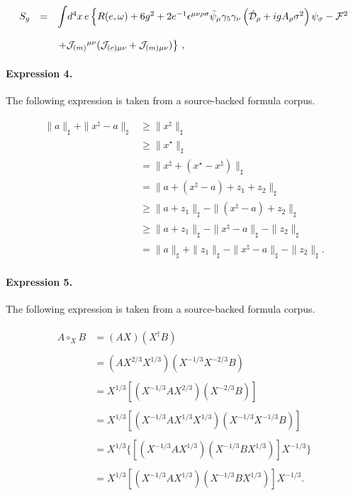 \documentclass[11pt]{article}
\begin{document}
\begin{align*}\begin{array}{rcl}S_{g} & = & {\displaystyle\int} d^{4}x\, e \left\{ R(e,\omega) +6g^{2}+2 e^{-1}\epsilon^{\mu\nu\rho\sigma}\bar{\psi}_{\mu}\gamma_{5}\gamma_{\nu}\left(\hat{\cal D}_{\rho}+ig A_{\rho}\sigma^{2}\right)\psi_{\sigma}-{\cal F}^{2} \right.\\& & \\& & \left. +{\cal J}_{(m)}{}^{\mu\nu}({\cal J}_{(e) \mu\nu} +{\cal J}_{(m) \mu\nu}) \right\}\, ,\end{array}\end{align*}

\paragraph{Expression 4.} The following expression is taken from a source-backed formula corpus.

\begin{align*}\|a\|_\sharp+\|x^\natural-a\|_\sharp&\geq\|x^\natural\|_\sharp\\&\geq\|x^\star\|_\sharp\\&=\|x^\natural+(x^\star-x^\natural)\|_\sharp\\&=\|a+(x^\natural-a)+z_1+z_2\|_\sharp\\&\geq\|a+z_1\|_\sharp-\|(x^\natural-a)+z_2\|_\sharp\\&\geq\|a+z_1\|_\sharp-\|x^\natural-a\|_\sharp-\|z_2\|_\sharp\\&=\|a\|_\sharp+\|z_1\|_\sharp-\|x^\natural-a\|_\sharp-\|z_2\|_\sharp.\end{align*}

\paragraph{Expression 5.} The following expression is taken from a source-backed formula corpus.

\begin{align*}\begin{array}{rl}A\circ_{X}B & = (AX)(X^{ \dagger }B) \\ \\& = (AX^{2/3}X^{1/3})(X^{-1/3}X^{-2/3}B) \\ \\& = X^{1/3}[(X^{-1/3}AX^{2/3})(X^{-2/3}B)] \\ \\& = X^{1/3}[(X^{-1/3}AX^{1/3}X^{1/3})(X^{-1/3}X^{-1/3}B)] \\ \\& = X^{1/3}\{[(X^{-1/3}AX^{1/3})(X^{-1/3}BX^{1/3})]X^{-1/3}\} \\\\ & = X^{1/3}[(X^{-1/3}AX^{1/3})(X^{-1/3}BX^{1/3})]X^{-1/3}. \\\end{array}\end{align*}
\end{document}
